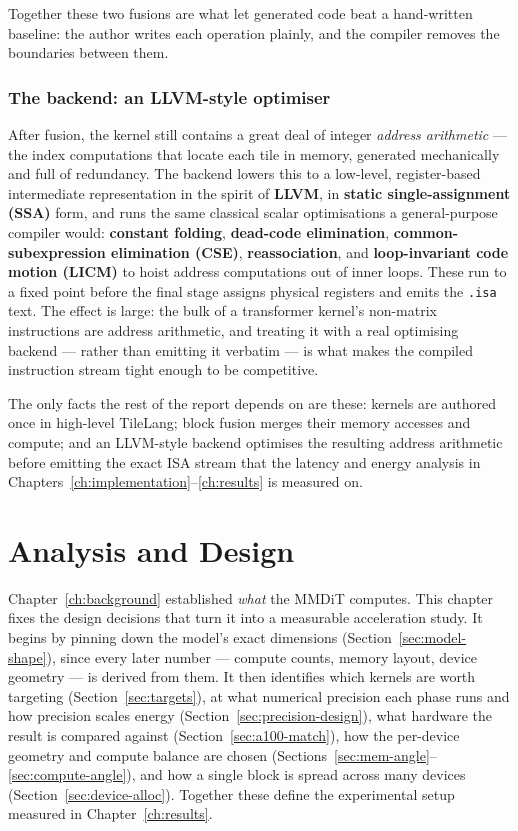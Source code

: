\documentclass[11pt]{report}
\begin{document}
Together these two fusions are what let generated code beat a hand-written
baseline: the author writes each operation plainly, and the compiler
removes the boundaries between them.

\subsection{The backend: an LLVM-style optimiser}

After fusion, the kernel still contains a great deal of integer
\emph{address arithmetic} --- the index computations that locate each tile
in memory, generated mechanically and full of redundancy. The backend
lowers this to a low-level, register-based intermediate representation in
the spirit of \textbf{LLVM}, in \textbf{static single-assignment (SSA)}
form, and runs the same classical scalar optimisations a general-purpose
compiler would: \textbf{constant folding}, \textbf{dead-code elimination},
\textbf{common-subexpression elimination (CSE)}, \textbf{reassociation},
and \textbf{loop-invariant code motion (LICM)} to hoist address
computations out of inner loops. These run to a fixed point before the
final stage assigns physical registers and emits the \texttt{.isa} text.
The effect is large: the bulk of a transformer kernel's non-matrix
instructions are address arithmetic, and treating it with a real
optimising backend --- rather than emitting it verbatim --- is what makes
the compiled instruction stream tight enough to be competitive.

\medskip
The only facts the rest of the report depends on are these: kernels are
authored once in high-level TileLang; block fusion merges their memory
accesses and compute; and an LLVM-style backend optimises the resulting
address arithmetic before emitting the exact ISA stream that the latency
and energy analysis in Chapters~\ref{ch:implementation}--\ref{ch:results}
is measured on.


\chapter{Analysis and Design}
\label{ch:analysis}

Chapter~\ref{ch:background} established \emph{what} the MMDiT computes.
This chapter fixes the design decisions that turn it into a measurable
acceleration study. It begins by pinning down the model's exact dimensions
(Section~\ref{sec:model-shape}), since every later number --- compute
counts, memory layout, device geometry --- is derived from them. It then
identifies which kernels are worth targeting
(Section~\ref{sec:targets}), at what numerical precision each phase runs
and how precision scales energy (Section~\ref{sec:precision-design}), what
hardware the result is compared against (Section~\ref{sec:a100-match}), how
the per-device geometry and compute balance are chosen
(Sections~\ref{sec:mem-angle}--\ref{sec:compute-angle}), and how a single
block is spread across many devices (Section~\ref{sec:device-alloc}).
Together these define the experimental setup measured in
Chapter~\ref{ch:results}.
\end{document}
